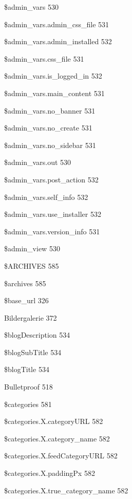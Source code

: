 \documentclass{book}
\renewcommand\subitem{\par}
\begin{document}
\begin{multicols}{2}
\begin{osp-index}
    \subitem \$admin\_vars\hspace{1mm} 530
    \subitem \$admin\_vars.admin\_css\_file\hspace{1mm} 531
    \subitem \$admin\_vars.admin\_installed\hspace{1mm} 532
    \subitem \$admin\_vars.css\_file\hspace{1mm} 531
    \subitem \$admin\_vars.is\_logged\_in\hspace{1mm} 532
    \subitem \$admin\_vars.main\_content\hspace{1mm} 531
    \subitem \$admin\_vars.no\_banner\hspace{1mm} 531
    \subitem \$admin\_vars.no\_create\hspace{1mm} 531
    \subitem \$admin\_vars.no\_sidebar\hspace{1mm} 531
    \subitem \$admin\_vars.out\hspace{1mm} 530
    \subitem \$admin\_vars.post\_action\hspace{1mm} 532
    \subitem \$admin\_vars.self\_info\hspace{1mm} 532
    \subitem \$admin\_vars.use\_installer\hspace{1mm} 532
    \subitem \$admin\_vars.version\_info\hspace{1mm} 531
    \subitem \$admin\_view\hspace{1mm} 530
    \subitem \$ARCHIVES\hspace{1mm} 585
    \subitem \$archives\hspace{1mm} 585
    \subitem \$base\_url\hspace{1mm} 326
    \subitem Bildergalerie\hspace{1mm} 372
    \subitem \$blogDescription\hspace{1mm} 534
    \subitem \$blogSubTitle\hspace{1mm} 534
    \subitem \$blogTitle\hspace{1mm} 534
    \subitem Bulletproof\hspace{1mm} 518
    \subitem \$categories\hspace{1mm} 581
    \subitem \$categories.X.categoryURL\hspace{1mm} 582
    \subitem \$categories.X.category\_name\hspace{1mm} 582
    \subitem \$categories.X.feedCategoryURL\hspace{1mm} 582
    \subitem \$categories.X.paddingPx\hspace{1mm} 582
    \subitem \$categories.X.true\_category\_name\hspace{1mm} 582

\end{osp-index}
\end{multicols}
\end{document}
